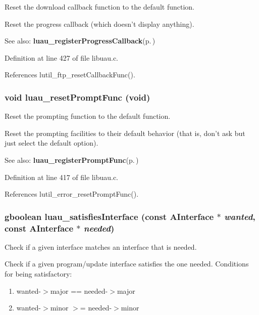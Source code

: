Reset the download callback function to the default function. 

Reset the progress callback (which doesn't display anything).

\begin{Desc}
\item[See also:]{\bf luau\_\-register\-Progress\-Callback}{\rm (p.\,\pageref{libuau_8h_a59})} \end{Desc}


Definition at line 427 of file libuau.c.

References lutil\_\-ftp\_\-reset\-Callback\-Func().
\subsubsection{\setlength{\rightskip}{0pt plus 5cm}void luau\_\-reset\-Prompt\-Func (void)}\label{libuau_8h_a60}


Reset the prompting function to the default function. 

Reset the prompting facilities to their default behavior (that is, don't ask but just select the default option).

\begin{Desc}
\item[See also:]{\bf luau\_\-register\-Prompt\-Func}{\rm (p.\,\pageref{libuau_8h_a58})} \end{Desc}


Definition at line 417 of file libuau.c.

References lutil\_\-error\_\-reset\-Prompt\-Func().
\subsubsection{\setlength{\rightskip}{0pt plus 5cm}gboolean luau\_\-satisfies\-Interface (const {\bf AInterface} $\ast$ {\em wanted}, const {\bf AInterface} $\ast$ {\em needed})}\label{libuau_8h_a85}


Check if a given interface matches an interface that is needed. 

Check if a given program/update interface satisfies the one needed. Conditions for being satisfactory: \begin{enumerate}
\item wanted-$>$major == needed-$>$major \item wanted-$>$minor $>$= needed-$>$minor \end{enumerate}


